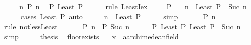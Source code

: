 \begin{isabellebody}
%
\isadelimproof
%
\endisadelimproof
%
\isatagproof
{}\isamarkupfalse%
\ {\isacharminus}{\kern0pt}\isanewline
\ \ \isamarkupfalse%
\ {\isacartoucheopen}{\isasymexists}n{\isachardot}{\kern0pt}\ P\ n{\isacartoucheclose}\ \isamarkupfalse%
\ {\isachardoublequoteopen}P\ {\isacharparenleft}{\kern0pt}Least\ P{\isacharparenright}{\kern0pt}{\isachardoublequoteclose}\isanewline
\ \ \ \ \isamarkupfalse%
\ {\isacharparenleft}{\kern0pt}rule\ LeastI{\isacharunderscore}{\kern0pt}ex{\isacharparenright}{\kern0pt}\isanewline
\ \ \isamarkupfalse%
\ {\isacartoucheopen}{\isasymnot}\ P\ {}{\isacartoucheclose}\ \isamarkupfalse%
\ n\ \ {\isachardoublequoteopen}Least\ P\ {\isacharequal}{\kern0pt}\ Suc\ n{\isachardoublequoteclose}\isanewline
\ \ \ \ \isamarkupfalse%
\ {\isacharparenleft}{\kern0pt}cases\ {\isachardoublequoteopen}Least\ P{\isachardoublequoteclose}{\isacharparenright}{\kern0pt}\ auto\isanewline
\ \ \isamarkupfalse%
\ \isamarkupfalse%
\ {\isachardoublequoteopen}n\ {\isacharless}{\kern0pt}\ Least\ P{\isachardoublequoteclose}\isanewline
\ \ \ \ \isamarkupfalse%
\ simp\isanewline
\ \ \isamarkupfalse%
\ \isamarkupfalse%
\ {\isachardoublequoteopen}{\isasymnot}\ P\ n{\isachardoublequoteclose}\isanewline
\ \ \ \ \isamarkupfalse%
\ {\isacharparenleft}{\kern0pt}rule\ not{\isacharunderscore}{\kern0pt}less{\isacharunderscore}{\kern0pt}Least{\isacharparenright}{\kern0pt}\isanewline
\ \ \isamarkupfalse%
\ \isamarkupfalse%
\ {\isachardoublequoteopen}{\isasymnot}\ P\ n\ {\isasymand}\ P\ {\isacharparenleft}{\kern0pt}Suc\ n{\isacharparenright}{\kern0pt}{\isachardoublequoteclose}\isanewline
\ \ \ \ \isamarkupfalse%
\ {\isacartoucheopen}P\ {\isacharparenleft}{\kern0pt}Least\ P{\isacharparenright}{\kern0pt}{\isacartoucheclose}\ {\isacartoucheopen}Least\ P\ {\isacharequal}{\kern0pt}\ Suc\ n{\isacartoucheclose}\ \isamarkupfalse%
\ simp\isanewline
\ \ \isamarkupfalse%
\ \isamarkupfalse%
\ {\isacharquery}{\kern0pt}thesis\ \isacommand{{\isachardot}{\kern0pt}{\isachardot}{\kern0pt}}\isamarkupfalse%
\isanewline
{}\isamarkupfalse%
%
\endisatagproof
{\isafoldproof}%
%
\isadelimproof
\isanewline
%
\endisadelimproof
\isanewline
{}\isamarkupfalse%
\ floor{\isacharunderscore}{\kern0pt}exists{\isacharcolon}{\kern0pt}\isanewline
\ \ \ x\ {\isacharcolon}{\kern0pt}{\isacharcolon}{\kern0pt}\ {\isachardoublequoteopen}{\isacharprime}{\kern0pt}a{\isacharcolon}{\kern0pt}{\isacharcolon}{\kern0pt}archimedean{\isacharunderscore}{\kern0pt}field{\isachardoublequoteclose}\isanewline

\end{isabellebody}
